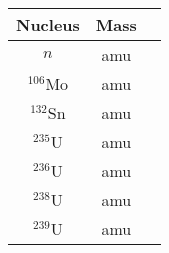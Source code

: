 \documentclass{report}
\begin{document}
\begin{table}[htbp]
	\centering
	\begin{tabular}{|c|c|c|}
			\hline
			Nucleus		&	Mass 	\\
			\hline	
			$n$			&  amu \\
			$^{106}$Mo	&  amu \\
			$^{132}$Sn	&  amu \\
			$^{235}$U	&  amu \\
			$^{236}$U	&  amu \\	
			$^{238}$U	&  amu \\
			$^{239}$U	&  amu \\
			\hline
	\end{tabular}
	\label{tab:design-specs}
\end{table}
\end{document}
